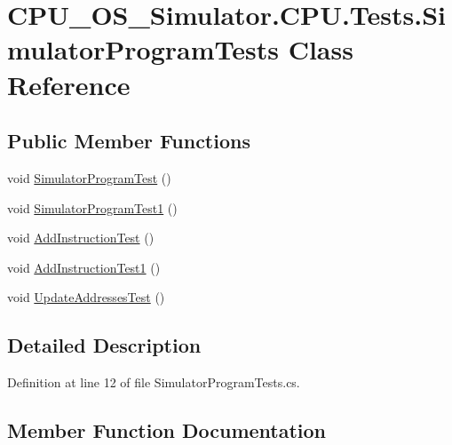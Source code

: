 \hypertarget{class_c_p_u___o_s___simulator_1_1_c_p_u_1_1_tests_1_1_simulator_program_tests}{}\section{C\+P\+U\+\_\+\+O\+S\+\_\+\+Simulator.\+C\+P\+U.\+Tests.\+Simulator\+Program\+Tests Class Reference}
\label{class_c_p_u___o_s___simulator_1_1_c_p_u_1_1_tests_1_1_simulator_program_tests}
\subsection*{Public Member Functions}
\begin{DoxyCompactItemize}
\item 
void \hyperlink{class_c_p_u___o_s___simulator_1_1_c_p_u_1_1_tests_1_1_simulator_program_tests_a86776e466d36e5138765fdf648211fc7}{Simulator\+Program\+Test} ()
\item 
void \hyperlink{class_c_p_u___o_s___simulator_1_1_c_p_u_1_1_tests_1_1_simulator_program_tests_a4bc06b230e557ec3bb036e33bea4b59a}{Simulator\+Program\+Test1} ()
\item 
void \hyperlink{class_c_p_u___o_s___simulator_1_1_c_p_u_1_1_tests_1_1_simulator_program_tests_a0abe728005b8d75576cc7cb5bac436c0}{Add\+Instruction\+Test} ()
\item 
void \hyperlink{class_c_p_u___o_s___simulator_1_1_c_p_u_1_1_tests_1_1_simulator_program_tests_ad708220fd97704b0807b1dfcbbfff6ad}{Add\+Instruction\+Test1} ()
\item 
void \hyperlink{class_c_p_u___o_s___simulator_1_1_c_p_u_1_1_tests_1_1_simulator_program_tests_a21f054ad89eae1b93628e9ea94a32092}{Update\+Addresses\+Test} ()
\end{DoxyCompactItemize}


\subsection{Detailed Description}


Definition at line 12 of file Simulator\+Program\+Tests.\+cs.



\subsection{Member Function Documentation}
\hypertarget{class_c_p_u___o_s___simulator_1_1_c_p_u_1_1_tests_1_1_simulator_program_tests_a0abe728005b8d75576cc7cb5bac436c0}{}
